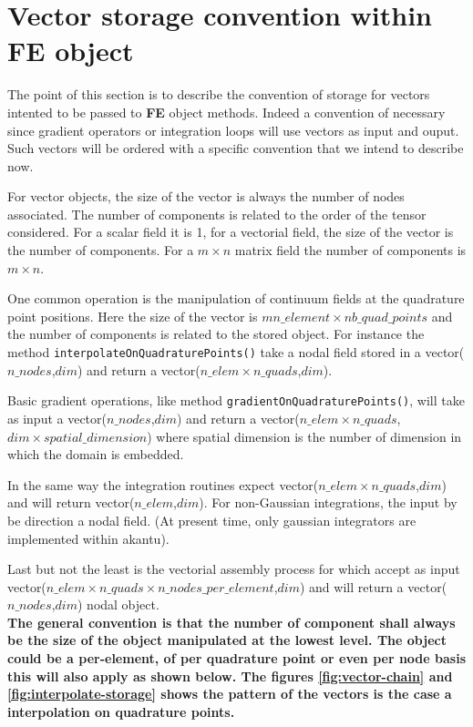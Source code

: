 \documentclass[a4paper,11pt]{book}
\begin{document}
\section{Vector storage convention within FE object\label{sec:FE-convention}}

The point of  this section is to describe the convention  of storage for vectors
intented  to be  passed to  {\bf  FE} object  methods.  Indeed  a convention  of
necessary  since gradient  operators or  integration loops  will use  vectors as
input and ouput.   Such vectors will be ordered with  a specific convention that
we intend to describe now.

For  vector objects,  the  size of  the vector  is  always the  number of  nodes
associated.  The number  of components  is related  to the  order of  the tensor
considered. For a scalar  field it is 1, for a vectorial  field, the size of the
vector is the number of components. For a $m\times n$ matrix field the number of
components is $m\times n$.

One common operation  is the manipulation of continuum  fields at the quadrature
point  positions.   Here  the  size   of  the  vector  is   $mn\_element  \times
nb\_quad\_points$  and  the  number  of  components is  related  to  the  stored
object.  For instance the  method \verb$interpolateOnQuadraturePoints()$  take a
nodal field  stored in a  vector($n\_nodes$,$dim$) and return  a vector($n\_elem
\times n\_quads$,$dim$).

Basic gradient operations, like method \verb$gradientOnQuadraturePoints()$, will
take  as input a  vector($n\_nodes$,$dim$) and  return a  vector($n\_elem \times
n\_quads$,$dim \times spatial\_dimension$) where spatial dimension is the number
of dimension in which the domain is embedded.

In  the  same  way   the  integration  routines  expect  vector($n\_elem  \times
n\_quads$,$dim$)  and  will  return vector($n\_elem$,$dim$).   For  non-Gaussian
integrations, the input  by be direction a nodal field.   (At present time, only
gaussian integrators are implemented within akantu).

Last but  not the least  is the vectorial  assembly process for which  accept as
input vector($n\_elem \times n\_quads \times n\_nodes\_per\_element$,$dim$)
and will return a vector($n\_nodes$,$dim$) nodal object.\\

{\bf The general convention is that  the number of component shall always be the
  size of  the object manipulated  at the lowest  level.  The object could  be a
  per-element, of  per quadrature point  or even per  node basis this  will also
  apply as shown below. The figures \ref{fig:vector-chain} and \ref{fig:interpolate-storage} shows the pattern of
  the vectors is the case a interpolation on quadrature points.}
\end{document}
